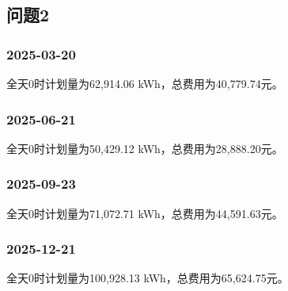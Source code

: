 \subsection{问题2}
\noindent\begin{minipage}{\linewidth}
\subsubsection*{2025-03-20}


全天0时计划量为62,914.06 kWh，总费用为40,779.74元。


\end{minipage}
\par\medskip
\noindent\begin{minipage}{\linewidth}
\subsubsection*{2025-06-21}


全天0时计划量为50,429.12 kWh，总费用为28,888.20元。


\end{minipage}
\par\medskip
\noindent\begin{minipage}{\linewidth}
\subsubsection*{2025-09-23}


全天0时计划量为71,072.71 kWh，总费用为44,591.63元。


\end{minipage}
\par\medskip
\noindent\begin{minipage}{\linewidth}
\subsubsection*{2025-12-21}


全天0时计划量为100,928.13 kWh，总费用为65,624.75元。


\end{minipage}
\par\medskip


